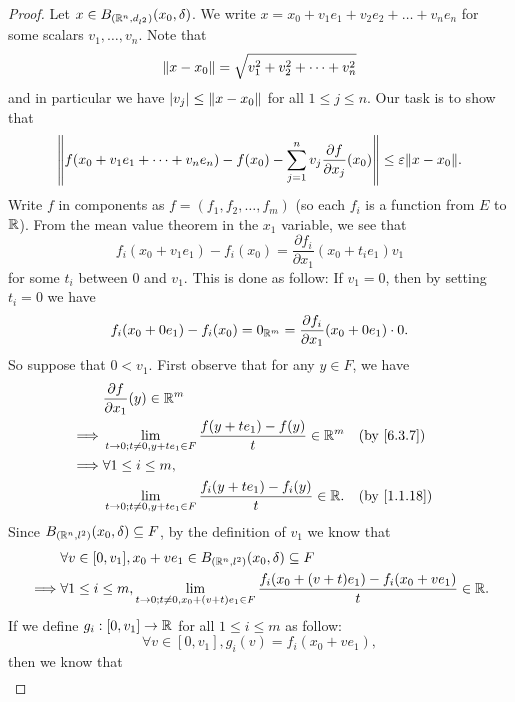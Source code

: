 \begin{proof}
  Let \(x \in B_{(\R^n, d_{l^2})}(x_0, \delta)\).
  We write \(x = x_0 + v_1 e_1 + v_2 e_2 + \dots + v_n e_n\) for some scalars \(v_1, \dots, v_n\).
  Note that
  \[
    \norm*{x - x_0} = \sqrt{v_1^2 + v_2^2 + \dots + v_n^2}
  \]
  and in particular we have \(\abs{v_j} \leq \norm*{x - x_0}\) for all \(1 \leq j \leq n\).
  Our task is to show that
  \[
    \norm*{f(x_0 + v_1 e_1 + \dots + v_n e_n) - f(x_0) - \sum_{j = 1}^n v_j \dfrac{\partial f}{\partial x_j}(x_0)} \leq \varepsilon \norm*{x - x_0}.
  \]
  Write \(f\) in components as \(f = (f_1 , f_2, \dots, f_m)\)
  (so each \(f_i\) is a function from \(E\) to \(\R\)).
  From the mean value theorem in the \(x_1\) variable, we see that
  \[
    f_i(x_0 + v_1 e_1) - f_i(x_0) = \dfrac{\partial f_i}{\partial x_1}(x_0 + t_i e_1) v_1
  \]
  for some \(t_i\) between \(0\) and \(v_1\).
  This is done as follow:
  If \(v_1 = 0\), then by setting \(t_i = 0\) we have
  \[
    f_i(x_0 + 0 e_1) - f_i(x_0) = 0_{\R^m} = \dfrac{\partial f_i}{\partial x_1}(x_0 + 0 e_1) \cdot 0.
  \]
  So suppose that \(0 < v_1\).
  First observe that for any \(y \in F\), we have
  \begin{align*}
             & \dfrac{\partial f}{\partial x_1}(y) \in \R^m                                                           \\
    \implies & \lim_{t \to 0 ; t \neq 0, y + t e_1 \in F} \dfrac{f(y + t e_1) - f(y)}{t} \in \R^m    &  & \by{6.3.7}  \\
    \implies & \forall 1 \leq i \leq m,                                                                               \\
             & \lim_{t \to 0 ; t \neq 0, y + t e_1 \in F} \dfrac{f_i(y + t e_1) - f_i(y)}{t} \in \R. &  & \by{1.1.18}
  \end{align*}
  Since \(B_{(\R^n, l^2)}(x_0, \delta) \subseteq F\), by the definition of \(v_1\) we know that
  \begin{align*}
             & \forall v \in [0, v_1], x_0 + v e_1 \in B_{(\R^n, l^2)}(x_0, \delta) \subseteq F                                                         \\
    \implies & \forall 1 \leq i \leq m, \lim_{t \to 0 ; t \neq 0, x_0 + (v + t) e_1 \in F} \dfrac{f_i(x_0 + (v + t) e_1) - f_i(x_0 + v e_1)}{t} \in \R.
  \end{align*}
  If we define \(g_i : [0, v_1] \to \R\) for all \(1 \leq i \leq m\) as follow:
  \[
    \forall v \in [0, v_1], g_i(v) = f_i(x_0 + v e_1),
  \]
  then we know that
  \begin{align*}

\end{align*}
\end{proof}
